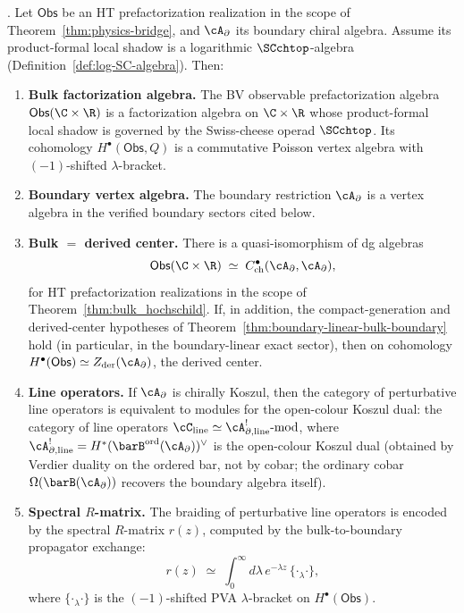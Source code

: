 \begin{theorem}%
\label{thm:bulk-boundary-line-factorization}
\ClaimStatusConditional.
Let $\mathsf{Obs}$ be an HT prefactorization realization in the
scope of Theorem~\ref{thm:physics-bridge}, and $\cA_\partial$ its
boundary chiral algebra. Assume its
product-formal local shadow is a logarithmic $\SCchtop$-algebra
\textup{(}Definition~\textup{\ref{def:log-SC-algebra})}.
Then:
\begin{enumerate}[label=\textup{(\roman*)}]
\item \textbf{Bulk factorization algebra.}
The BV observable prefactorization algebra
$\mathsf{Obs}(\C \times \R)$ is a factorization algebra on
$\C \times \R$ whose product-formal local shadow is governed by
the Swiss-cheese operad $\SCchtop$.
Its cohomology $H^\bullet(\mathsf{Obs}, Q)$ is a commutative
Poisson vertex algebra with $(-1)$-shifted $\lambda$-bracket.

\item \textbf{Boundary vertex algebra.}
The boundary restriction $\cA_\partial$ is a vertex algebra in the
verified boundary sectors cited below.

\item \textbf{Bulk $=$ derived center.}
There is a quasi-isomorphism of dg algebras
\[
\mathsf{Obs}(\C \times \R)
\;\simeq\;
C^\bullet_{\mathrm{ch}}(\cA_\partial, \cA_\partial),
\]
for HT prefactorization realizations in the scope of
Theorem~\ref{thm:bulk_hochschild}. If, in addition, the
compact-generation and derived-center hypotheses of
Theorem~\ref{thm:boundary-linear-bulk-boundary} hold
\textup{(}in particular, in the boundary-linear exact sector\textup{)},
then on cohomology
$H^\bullet(\mathsf{Obs}) \simeq Z_{\mathrm{der}}(\cA_\partial)$,
the derived center.

\item \textbf{Line operators.}
If\/ $\cA_\partial$ is chirally Koszul, then the category of perturbative line operators
is equivalent to modules for the open-colour Koszul dual:
the category of line operators
$\cC_{\mathrm{line}} \simeq \cA_{\partial,\mathrm{line}}^!\text{-}\mathrm{mod}$,
where $\cA_{\partial,\mathrm{line}}^! =
H^*(\barB^{\mathrm{ord}}(\cA_\partial))^\vee$ is the open-colour
Koszul dual \textup{(}obtained by Verdier duality on the ordered
bar, not by cobar; the ordinary cobar $\Omega(\barB(\cA_\partial))$
recovers the boundary algebra itself\textup{)}.

\item \textbf{Spectral $R$-matrix.}
The braiding of perturbative line operators is encoded by the spectral
$R$-matrix $r(z)$, computed by the bulk-to-boundary
propagator exchange:
\[
r(z) \;\simeq\; \int_0^\infty d\lambda\, e^{-\lambda z}\,
\{{\cdot}{}_\lambda{\cdot}\},
\]
where $\{{\cdot}{}_\lambda{\cdot}\}$ is the $(-1)$-shifted
PVA $\lambda$-bracket on $H^\bullet(\mathsf{Obs})$.
\end{enumerate}
\end{theorem}


